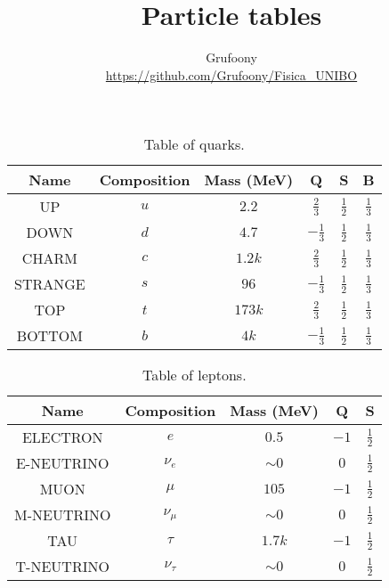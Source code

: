 \documentclass{article}
\begin{document}
\title{Particle tables}
\author{Grufoony\\\url{https://github.com/Grufoony/Fisica_UNIBO}}
\maketitle
\listoftables
\vspace{5pt}

\begin{table}[h!]
    \centering
    \begin{tabular}{||c c c c c c||} 
    \hline
    Name & Composition & Mass (MeV) & Q & S & B \\ [0.5ex] 
    \hline\hline
    UP & $u$ & $2.2$ & $\frac{2}{3}$ & $\frac{1}{2}$ & $\frac{1}{3}$\\[1ex] 
    DOWN & $d$ & $4.7$ & $-\frac{1}{3}$ & $\frac{1}{2}$ & $\frac{1}{3}$\\[1ex]
    CHARM & $c$ & $1.2k$ & $\frac{2}{3}$ & $\frac{1}{2}$ & $\frac{1}{3}$\\[1ex]
    STRANGE & $s$ & $96$ & $-\frac{1}{3}$ & $\frac{1}{2}$ & $\frac{1}{3}$\\[1ex]
    TOP & $t$ & $173k$ & $\frac{2}{3}$ & $\frac{1}{2}$ & $\frac{1}{3}$\\[1ex]
    BOTTOM & $b$ & $4k$ & $-\frac{1}{3}$ & $\frac{1}{2}$ & $\frac{1}{3}$\\[1ex]
    \hline
    \end{tabular}
    \caption{Table of quarks.}
    \label{table:quarks}
\end{table}

\begin{table}[h!]
    \centering
    \begin{tabular}{||c c c c c ||} 
     \hline
     Name & Composition & Mass (MeV) & Q & S \\ [0.5ex] 
     \hline\hline
     ELECTRON & $e$ & $0.5$ & $-1$ & $\frac{1}{2}$ \\[1ex] 
     E-NEUTRINO & $\nu_e$ & $\sim 0$ & $0$ & $\frac{1}{2}$ \\[1ex]
     MUON & $\mu$ & $105$ & $-1$ & $\frac{1}{2}$ \\[1ex]
     M-NEUTRINO & $\nu_\mu$ & $\sim 0$ & $0$ & $\frac{1}{2}$ \\[1ex]
     TAU & $\tau$ & $1.7k$ & $-1$ & $\frac{1}{2}$ \\[1ex]
     T-NEUTRINO & $\nu_\tau$ & $\sim 0$ & $0$ & $\frac{1}{2}$ \\[1ex]
     \hline
    \end{tabular}
    \caption{Table of leptons.}
    \label{table:leptons}
\end{table}
\end{document}

